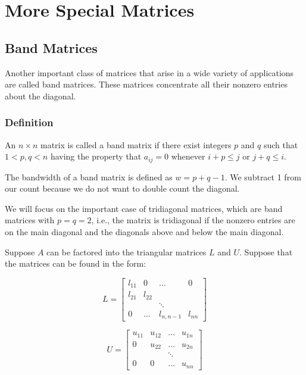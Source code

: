 \renewcommand{\arraystretch}{1.25} %
\setlength{\arraycolsep}{12pt}

\section{More Special Matrices}

\subsection{Band Matrices}
Another important class of matrices that arise in a wide variety of 
applications are called band matrices. These matrices concentrate all their 
nonzero entries about the diagonal.

\subsubsection{Definition}
An $n \times n$ matrix is called a band matrix if there exist integers $p$ and
$q$ such that $1 < p, q < n$ having the property that $a_{ij} = 0$ whenever
$i + p \leq j$ or $j + q \leq i$.

The bandwidth of a band matrix is defined as $w = p+q-1$. We subtract 1 from 
our count because we do not want to double count the diagonal.

We will focus on the important case of tridiagonal matrices, which are band 
matrices with $p = q = 2$, i.e., the matrix is tridiagonal if the nonzero 
entries are on the main diagonal and the diagonals above and below the main 
diagonal.

Suppose $A$ can be factored into the triangular matrices $L$ and $U$. Suppose
that the matrices can be found in the form:

\[
L = \begin{bmatrix}
    l_{11} & 0 & \dots & 0 \\
    l_{21} & l_{22} & & \\
    & & \ddots & \\
    0 & \dots & l_{n,n-1} & l_{nn}
\end{bmatrix}
\]

\[
U = \begin{bmatrix}
    u_{11} & u_{12} & \dots & u_{1n} \\
    0 & u_{22} & \dots & u_{2n} \\
    & & \ddots & \\
    0 & 0 & \dots & u_{nn}
\end{bmatrix}
\]

